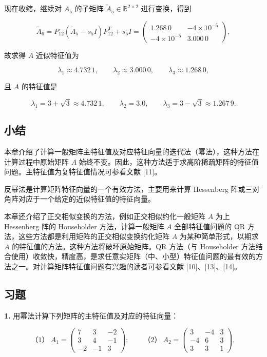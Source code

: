 现在收缩，继续对 \(A_5\) 的子矩阵 \(\widetilde A_5\in\mathbb R^{2\times2}\) 进行变换，得到

\[
\widetilde A_6=P_{12}(\widetilde A_5-s_5I)P_{12}^{\mathrm T}+s_5I
=\begin{pmatrix}\boxed{1.268\,0}&-4\times10^{-5}\\-4\times10^{-5}&\boxed{3.000\,0}\end{pmatrix},
\]

故求得 \(A\) 近似特征值为

\[
\lambda_1\approx4.732\,1,\qquad\lambda_2\approx3.000\,0,\qquad\lambda_3\approx1.268\,0,
\]

且 \(A\) 的特征值是

\[
\lambda_1=3+\sqrt3\approx4.732\,1,\qquad\lambda_2=3.0,\qquad\lambda_3=3-\sqrt3\approx1.267\,9.
\]

\subsection{小结}\label{ch09b-ux5c0fux7ed3}

本章介绍了计算一般矩阵主特征值及对应特征向量的迭代法（幂法），这种方法在计算过程中原始矩阵 \(A\) 始终不变。因此，这种方法适于求高阶稀疏矩阵的特征值问题。主特征值为复特征值情况可参看文献 {[}11{]}。

反幂法是计算矩阵特征向量的一个有效方法，主要用来计算 Hessenberg 阵或三对角阵对应于一个给定的近似特征值的特征向量。

本章还介绍了正交相似变换的方法，例如正交相似约化一般矩阵 \(A\) 为上 Hessenberg 阵的 Householder 方法，计算一般矩阵 \(A\) 全部特征值问题的 QR 方法，这些方法都是利用矩阵的正交相似变换约化矩阵 \(A\) 为某种简单形式，以期求 \(A\) 的特征值的方法。这种方法将破坏原始矩阵。QR 方法（与 Householder 方法结合使用）收敛快，精度高，是求任意实矩阵（中、小型）特征值问题的最有效的方法之一。对计算矩阵特征值问题有兴趣的读者可参看文献 {[}10{]}、{[}13{]}、{[}14{]}。

\subsection{习题}\label{ch09b-ux4e60ux9898}

\textbf{1.} 用幂法计算下列矩阵的主特征值及对应的特征向量：

\[
\text{（1）}\ A_1=\begin{pmatrix}7&3&-2\\3&4&-1\\-2&-1&3\end{pmatrix};\qquad
\text{（2）}\ A_2=\begin{pmatrix}3&-4&3\\-4&6&3\\3&3&1\end{pmatrix},
\]

